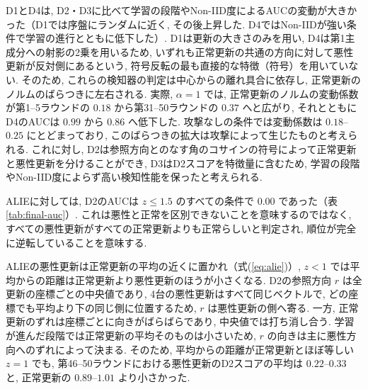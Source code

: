 \documentclass[a4j, twocolumn, dvipdfmx]{jsarticle}
\begin{document}
D1とD4は, D2・D3に比べて学習の段階やNon-IID度によるAUCの変動が大きかった（D1では序盤にランダムに近く, その後上昇した. D4ではNon-IIDが強い条件で学習の進行とともに低下した）. D1は更新の大きさのみを用い, D4は第1主成分への射影の2乗を用いるため, いずれも正常更新の共通の方向に対して悪性更新が反対側にあるという, 符号反転の最も直接的な特徴（符号）を用いていない. そのため, これらの検知器の判定は中心からの離れ具合に依存し, 正常更新のノルムのばらつきに左右される. 実際, $\alpha=1$ では, 正常更新のノルムの変動係数が第1--5ラウンドの $0.18$ から第31--50ラウンドの $0.37$ へと広がり, それとともにD4のAUCは $0.99$ から $0.86$ へ低下した. 攻撃なしの条件では変動係数は $0.18$--$0.25$ にとどまっており, このばらつきの拡大は攻撃によって生じたものと考えられる. これに対し, D2は参照方向とのなす角のコサインの符号によって正常更新と悪性更新を分けることができ, D3はD2スコアを特徴量に含むため, 学習の段階やNon-IID度によらず高い検知性能を保ったと考えられる.

ALIEに対しては, D2のAUCは $z \le 1.5$ のすべての条件で $0.00$ であった（表\ref{tab:final-auc}）. これは悪性と正常を区別できないことを意味するのではなく, すべての悪性更新がすべての正常更新よりも正常らしいと判定され, 順位が完全に逆転していることを意味する.

ALIEの悪性更新は正常更新の平均の近くに置かれ（式(\ref{eq:alie})）, $z<1$ では平均からの距離は正常更新より悪性更新のほうが小さくなる. D2の参照方向 $r$ は全更新の座標ごとの中央値であり, 4台の悪性更新はすべて同じベクトルで, どの座標でも平均より下の同じ側に位置するため, $r$ は悪性更新の側へ寄る. 一方, 正常更新のずれは座標ごとに向きがばらばらであり, 中央値では打ち消し合う. 学習が進んだ段階では正常更新の平均そのものは小さいため, $r$ の向きは主に悪性方向へのずれによって決まる. そのため, 平均からの距離が正常更新とほぼ等しい $z=1$ でも, 第46--50ラウンドにおける悪性更新のD2スコアの平均は $0.22$--$0.33$ と, 正常更新の $0.89$--$1.01$ より小さかった.
\end{document}
